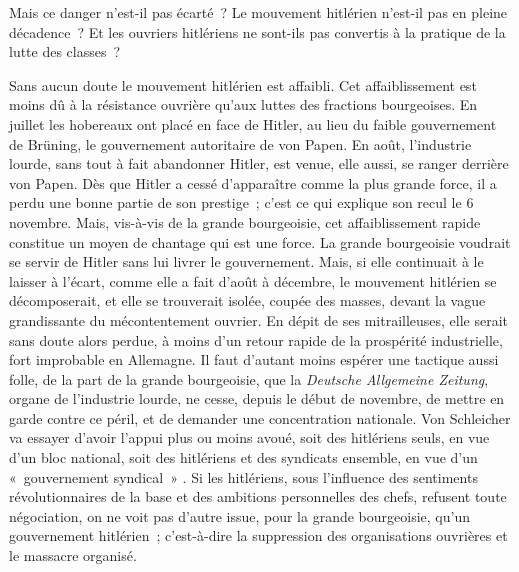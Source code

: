 \documentclass[french,twoside]{book} %
\begin{document}
Mais ce danger n'est-il pas écarté ? Le mouvement hitlérien n'est-il pas en pleine décadence ? Et les ouvriers hitlériens ne sont-ils pas convertis à la pratique de la lutte des classes ?\par
Sans aucun doute le mouvement hitlérien est affaibli. Cet affaiblissement est moins dû à la résistance ouvrière qu'aux luttes des fractions bourgeoises. En juillet les hobereaux ont placé en face de Hitler, au lieu du faible gouvernement de Brüning, le gouvernement autoritaire de von Papen. En août, l'industrie lourde, sans tout à fait abandonner Hitler, est venue, elle aussi, se ranger derrière von Papen. Dès que Hitler a cessé d'apparaître comme la plus grande force, il a perdu une bonne partie de son prestige ; c'est ce qui explique son recul le 6 novembre. Mais, vis-à-vis de la grande bourgeoisie, cet affai­blissement rapide constitue un moyen de chantage qui est une force. La grande bourgeoisie voudrait se servir de Hitler sans lui livrer le gouvernement. Mais, si elle continuait à le laisser à l'écart, comme elle a fait d'août à décembre, le mouvement hitlérien se décomposerait, et elle se trouverait isolée, coupée des masses, devant la vague grandissante du mécontentement ouvrier. En dépit de ses mitrailleuses, elle serait sans doute alors perdue, à moins d'un retour rapide de la prospérité industrielle, fort improbable en Allemagne. Il faut d'autant moins espérer une tactique aussi folle, de la part de la grande bourgeoisie, que la {\itshape Deutsche Allgemeine Zeitung}, organe de l'indus­trie lourde, ne cesse, depuis le début de novembre, de mettre en garde contre ce péril, et de demander une concentration nationale. Von Schleicher va essayer d'avoir l'appui plus ou moins avoué, soit des hitlériens seuls, en vue d'un bloc national, soit des hitlériens et des syndicats ensemble, en vue d'un « gouvernement syndical » . Si les hitlériens, sous l'influence des sentiments révolutionnaires de la base et des ambitions personnelles des chefs, refusent toute négociation, on ne voit pas d'autre issue, pour la grande bourgeoisie, qu'un gouvernement hitlérien ; c'est-à-dire la suppression des organisations ouvrières et le massacre organisé.\par
\end{document}
